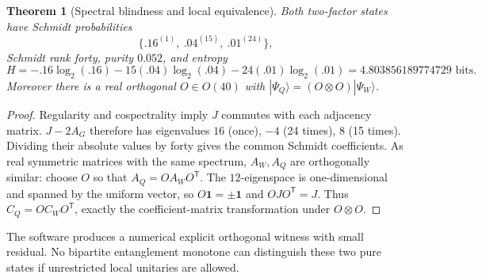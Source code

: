 \documentclass[10pt]{article}
\newtheorem{theorem}{Theorem}
\begin{document}
\begin{theorem}[Spectral blindness and local equivalence]
Both two-factor states have Schmidt probabilities
\[
\boxed{\{.16^{(1)},\ .04^{(15)},\ .01^{(24)}\}},
\]
Schmidt rank forty, purity $0.052$, and entropy
\[
H=-.16\log_2(.16)-15(.04)\log_2(.04)
  -24(.01)\log_2(.01)
 =4.803856189774729\text{ bits}.
\]
Moreover there is a real orthogonal $O\in O(40)$ with
$|\Psi_Q\rangle=(O\otimes O)|\Psi_W\rangle$.
\end{theorem}
\begin{proof}
Regularity and cospectrality imply $J$ commutes with
each adjacency matrix. $J-2A_G$ therefore has
eigenvalues $16$ (once), $-4$ (24 times), $8$
(15 times). Dividing their absolute values by
forty gives the common Schmidt coefficients.
As real symmetric matrices with the same spectrum,
$A_W,A_Q$ are orthogonally similar: choose $O$
so that $A_Q=OA_WO^{\mathsf T}$.
The $12$-eigenspace is one-dimensional and spanned
by the uniform vector, so $O\mathbf 1=\pm\mathbf 1$
and $OJO^{\mathsf T}=J$.
Thus $C_Q=OC_WO^{\mathsf T}$, exactly the
coefficient-matrix transformation under
$O\otimes O$.
\end{proof}
The software produces a numerical explicit
orthogonal witness with small residual.
No bipartite entanglement monotone can distinguish
these two pure states if unrestricted local
unitaries are allowed.
\end{document}
